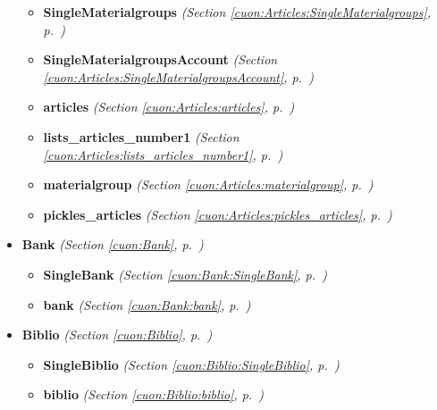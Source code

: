 \begin{itemize}
\begin{itemize}
    \item \textbf{SingleMaterialgroups}
  \textit{(Section \ref{cuon:Articles:SingleMaterialgroups}, p.~\pageref{cuon:Articles:SingleMaterialgroups})}

    \item \textbf{SingleMaterialgroupsAccount}
  \textit{(Section \ref{cuon:Articles:SingleMaterialgroupsAccount}, p.~\pageref{cuon:Articles:SingleMaterialgroupsAccount})}

    \item \textbf{articles}
  \textit{(Section \ref{cuon:Articles:articles}, p.~\pageref{cuon:Articles:articles})}

    \item \textbf{lists\_articles\_number1}
  \textit{(Section \ref{cuon:Articles:lists_articles_number1}, p.~\pageref{cuon:Articles:lists_articles_number1})}

    \item \textbf{materialgroup}
  \textit{(Section \ref{cuon:Articles:materialgroup}, p.~\pageref{cuon:Articles:materialgroup})}

    \item \textbf{pickles\_articles}
  \textit{(Section \ref{cuon:Articles:pickles_articles}, p.~\pageref{cuon:Articles:pickles_articles})}

  \end{itemize}
\item \textbf{Bank}
  \textit{(Section \ref{cuon:Bank}, p.~\pageref{cuon:Bank})}

  \begin{itemize}
\setlength{\parskip}{0ex}
    \item \textbf{SingleBank}
  \textit{(Section \ref{cuon:Bank:SingleBank}, p.~\pageref{cuon:Bank:SingleBank})}

    \item \textbf{bank}
  \textit{(Section \ref{cuon:Bank:bank}, p.~\pageref{cuon:Bank:bank})}

  \end{itemize}
\item \textbf{Biblio}
  \textit{(Section \ref{cuon:Biblio}, p.~\pageref{cuon:Biblio})}

  \begin{itemize}
\setlength{\parskip}{0ex}
    \item \textbf{SingleBiblio}
  \textit{(Section \ref{cuon:Biblio:SingleBiblio}, p.~\pageref{cuon:Biblio:SingleBiblio})}

    \item \textbf{biblio}
  \textit{(Section \ref{cuon:Biblio:biblio}, p.~\pageref{cuon:Biblio:biblio})}


\end{itemize}
\end{itemize}
